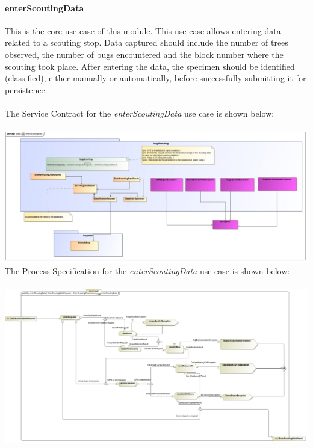 \documentclass[11pt,a4paper,titlepage]{article}
\begin{document}
		\paragraph{enterScoutingData }
		This is the core use case of this module. This use case allows entering data related to a scouting stop. Data captured should include the number of trees observed, the number of bugs encountered and the block number where the scouting took place. After entering the data, the specimen should be identified (classified), either manually or automatically, before successfully submitting it for persistence.\\\hfill\\
		The Service Contract for the \textit{enterScoutingData} use case is shown below:\\\hfill\\
		\includegraphics[width=\linewidth]{enterScoutingData}
		The Process Specification for the \textit{enterScoutingData} use case is shown below:\\\hfill\\
		\includegraphics[width=\linewidth]{enterScoutingDataPS}
		
		
		
		
	
\end{document}
